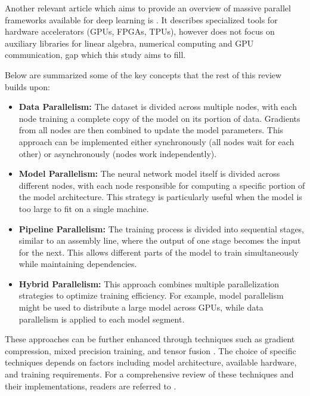 Another relevant article which aims to provide an overview of massive parallel frameworks available
for deep learning is \cite{nguyen_machine_2019}. It describes specialized tools for hardware
accelerators (GPUs, FPGAs, TPUs), however does not focus on auxiliary libraries for linear algebra,
numerical computing and GPU communication, gap which this study aims to fill.

Below are summarized some of the key concepts that the rest of this review builds upon:

\begin{itemize}
	\item \textbf{Data Parallelism:}
	      The dataset is divided across multiple nodes, with each node training a complete copy of the
	      model on its portion of data. Gradients from all nodes are then combined to update the model parameters.
	      This approach can be implemented either synchronously (all nodes wait for each other) or asynchronously (nodes work independently).

	\item \textbf{Model Parallelism:}
	      The neural network model itself is divided across different nodes, with each node responsible
	      for computing a specific portion of the model architecture. This strategy is particularly useful
	      when the model is too large to fit on a single machine.

	\item \textbf{Pipeline Parallelism:}
	      The training process is divided into sequential stages, similar to an assembly line,
	      where the output of one stage becomes the input for the next. This allows different parts
	      of the model to train simultaneously while maintaining dependencies.

	\item \textbf{Hybrid Parallelism:}
	      This approach combines multiple parallelization strategies to optimize training efficiency.
	      For example, model parallelism might be used to distribute a large model across GPUs, while
	      data parallelism is applied to each model segment.
\end{itemize}

These approaches can be further enhanced through techniques such as gradient compression, mixed
precision training, and tensor fusion \cite{dehghani_distributed_2023}. The choice of specific
techniques depends on factors including model architecture, available hardware, and training
requirements. For a comprehensive review of these techniques and their implementations, readers are
referred to \cite{chahal_hitchhikers_2018}.

